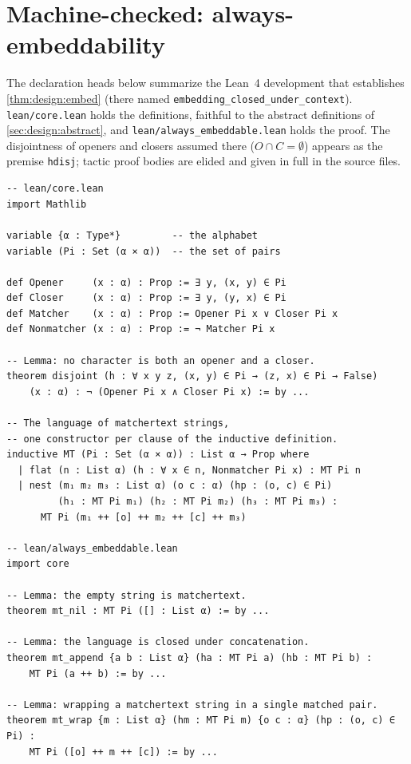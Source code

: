 \section{Machine-checked: always-embeddability}
\label{app:lean}

The declaration heads below summarize the Lean~4 development
that establishes \cref{thm:design:embed}
(there named \texttt{embedding\_closed\_under\_context}).
\nolinkurl{lean/core.lean} holds the definitions,
faithful to the abstract definitions of \cref{sec:design:abstract},
and \nolinkurl{lean/always_embeddable.lean} holds the proof.
The disjointness of openers and closers assumed there ($O \cap C = \emptyset$)
appears as the premise \texttt{hdisj};
tactic proof bodies are elided and given in full in the source files.

\begin{lstlisting}
-- lean/core.lean
import Mathlib

variable {α : Type*}         -- the alphabet
variable (Pi : Set (α × α))  -- the set of pairs

def Opener     (x : α) : Prop := ∃ y, (x, y) ∈ Pi
def Closer     (x : α) : Prop := ∃ y, (y, x) ∈ Pi
def Matcher    (x : α) : Prop := Opener Pi x ∨ Closer Pi x
def Nonmatcher (x : α) : Prop := ¬ Matcher Pi x

-- Lemma: no character is both an opener and a closer.
theorem disjoint (h : ∀ x y z, (x, y) ∈ Pi → (z, x) ∈ Pi → False)
    (x : α) : ¬ (Opener Pi x ∧ Closer Pi x) := by ...

-- The language of matchertext strings,
-- one constructor per clause of the inductive definition.
inductive MT (Pi : Set (α × α)) : List α → Prop where
  | flat (n : List α) (h : ∀ x ∈ n, Nonmatcher Pi x) : MT Pi n
  | nest (m₁ m₂ m₃ : List α) (o c : α) (hp : (o, c) ∈ Pi)
         (h₁ : MT Pi m₁) (h₂ : MT Pi m₂) (h₃ : MT Pi m₃) :
      MT Pi (m₁ ++ [o] ++ m₂ ++ [c] ++ m₃)

-- lean/always_embeddable.lean
import core

-- Lemma: the empty string is matchertext.
theorem mt_nil : MT Pi ([] : List α) := by ...

-- Lemma: the language is closed under concatenation.
theorem mt_append {a b : List α} (ha : MT Pi a) (hb : MT Pi b) :
    MT Pi (a ++ b) := by ...

-- Lemma: wrapping a matchertext string in a single matched pair.
theorem mt_wrap {m : List α} (hm : MT Pi m) {o c : α} (hp : (o, c) ∈ Pi) :
    MT Pi ([o] ++ m ++ [c]) := by ...


\end{lstlisting}
